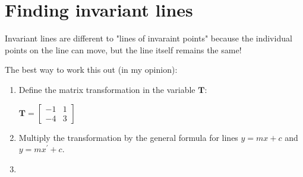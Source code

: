 \documentclass{article}[12pt]
\begin{document}
\begin{minipage}{\textwidth}
\section{Finding invariant lines}
Invariant lines are different to "lines of invaraint points" because the individual points on the line can move, but the line itself remains the same!

The best way to work this out (in my opinion):

\begin{enumerate}
    \item Define the matrix transformation in the variable $\boldsymbol{T}$: 
    
    \(\boldsymbol{T} = \begin{bmatrix} -1 & 1 \\ -4 & 3 \end{bmatrix}\)
    \item Multiply the transformation by the general formula for lines $y = mx + c$ and $y = mx^{'}+c$.
    \item 
    

\end{enumerate}
\end{minipage}
\end{document}
